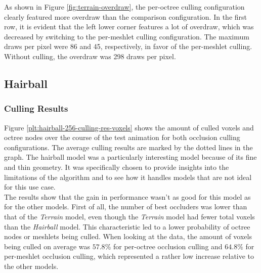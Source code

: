 \noindent
As shown in Figure \ref{fig:terrain-overdraw}, the per-octree culling configuration clearly 
featured more overdraw than the comparison configuration. In the first row, it is evident that 
the left lower corner features a lot of overdraw, which was decreased by switching to the 
per-meshlet culling configuration. The maximum draws per pixel were 86 and 45, respectively, in 
favor of the per-meshlet culling. Without culling, the overdraw was 298 draws per pixel.

\clearpage




\subsection*{Hairball}

\subsubsection*{Culling Results} \label{subsubsec-culling-results-hairball}

Figure \ref{plt:hairball-256-culling-res-voxels} shows the amount of culled voxels and octree nodes 
over the course of the test animation for both occlusion culling configurations. The average culling 
results are marked by the dotted lines in the graph. The hairball model was a particularly interesting 
model because of its fine and thin geometry. It was specifically chosen to provide insights into the 
limitations of the algorithm and to see how it handles models that are not ideal for this use case.\\

\noindent
The results show that the gain in performance wasn't as good for this model as for the other models.
First of all, the number of best occluders was lower than that of the \emph{Terrain} model, even though the 
\emph{Terrain} model had fewer total voxels than the \emph{Hairball} model. This characteristic led to 
a lower probability of octree nodes or meshlets being culled. When looking at the data, the amount of 
voxels being culled on average was $57.8\%$ for per-octree occlusion culling and $64.8\%$ for per-meshlet 
occlusion culling, which represented a rather low increase relative to the other models. 


